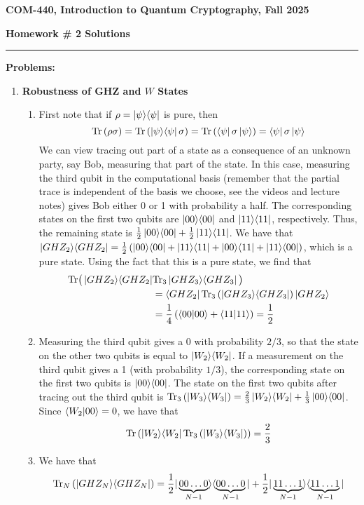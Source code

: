 \documentclass[12pt]{article}
\newcommand{\header}[1]{\begin{center} {\large\bf #1} \end{center}}
\begin{document}
\header{COM-440, Introduction to Quantum Cryptography, Fall 2025}
{\bf Homework \# 2 Solutions} 


\medskip

\hrule

 
\medskip
{\bf Problems:}

\begin{enumerate}
		

\item {\bf Robustness of GHZ and $W$ States}\label{ex:robust-GHZ}
\begin{enumerate}
\item
	First note that if $\rho = \ket{\psi}\!\bra{\psi}$ is pure, then
	\[\mathrm{Tr}\left(\rho \sigma\right) = \mathrm{Tr}\left(\ket{\psi}\!\bra{\psi} \sigma\right) = \mathrm{Tr}\left(\bra{\psi} \sigma\ket{\psi}\right) = \bra{\psi} \sigma\ket{\psi}\]
	We can view tracing out part of a state as a consequence of an unknown party, say Bob, measuring that part of the state. In this case, measuring the third qubit in the computational basis (remember that the partial trace is independent of the basis we choose, see the videos and lecture notes) gives Bob either 0 or 1 with probability a half. The corresponding states on the first two qubits are $\ket{00}\!\bra{00}$ and $\ket{11}\!\bra{11}$, respectively. Thus, the remaining state is $\frac{1}{2}\ket{00}\!\bra{00}+\frac{1}{2}\ket{11}\!\bra{11}$.
	We have that $\ket{GHZ_2}\!\bra{GHZ_2} = \frac{1}{2}\left(\ket{00}\!\bra{00}+\ket{11}\!\bra{11}+\ket{00}\!\bra{11}+\ket{11}\!\bra{00} \right)$, which is a pure state. Using the fact that this is a pure state, we find that
	\begin{align*}
		\mathrm{Tr}\big(\ket{GHZ_2}\!\bra{GHZ_2} & \mathrm{Tr}_3\ket{GHZ_3}\!\bra{GHZ_3}\big) \\
		& = \bra{GHZ_2} \mathrm{Tr}_3 \left(\ket{GHZ_3}\!\bra{GHZ_3}\right)\ket{GHZ_2}\\
		& = \frac{1}{4}\left(\langle 00 \vert 00\rangle+\langle 11 \vert 11\rangle\right)=\frac{1}{2}
	\end{align*}
\item
	Measuring the third qubit gives a 0 with probability $2/3$, so that the state on the other two qubits is equal to $\ket{W_2}\!\bra{W_2}$. If a measurement on the third qubit gives a 1 (with probability $1/3$), the corresponding state on the first two qubits is $\ket{00}\!\bra{00}$. The state on the first two qubits after tracing out the third qubit is $\mathrm{Tr}_3\left(\ket{W_3}\!\bra{W_3}\right) = \frac{2}{3}\ket{W_2}\!\bra{W_2}+\frac{1}{3}\ket{00}\!\bra{00}$.
	Since $\langle{W_2}|{00}\rangle = 0$, we have that $$\mathrm{Tr}\left(\ket{W_2}\!\bra{W_2} \mathrm{Tr}_3\left(\ket{W_3}\!\bra{W_3}\right)\right) = \frac{2}{3}$$
\item
	We have that
	\[\mathrm{Tr}_N \left(\ket{GHZ_N}\!\bra{GHZ_N}\right) = \frac{1}{2}|\underbrace{00\ldots0}_{N-1}\rangle\langle\underbrace{00\ldots0}_{N-1}|+\frac{1}{2}|\underbrace{11\ldots1}_{N-1}\rangle\langle\underbrace{11\ldots1}_{N-1}|\]

\end{enumerate}
\end{enumerate}
\end{document}
